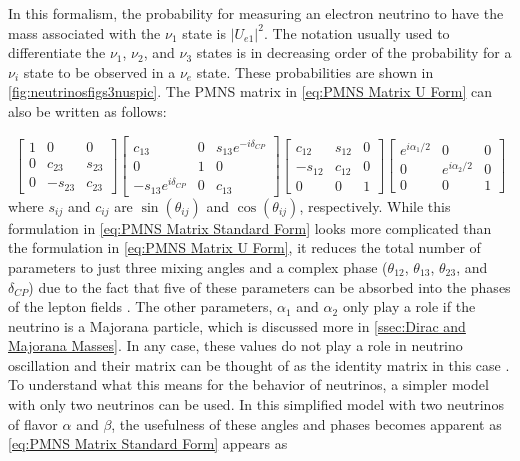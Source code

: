 In this formalism, the probability for measuring an electron neutrino to have the mass associated with the $\nu_1$ state is $|U_{e1}|^2$. The notation usually used to differentiate the $\nu_1$, $\nu_2$, and $\nu_3$ states is in decreasing order of the probability for a $\nu_i$ state to be observed in a $\nu_e$ state. These probabilities are shown in \autoref{fig:neutrinosfigs3nuspic}. The PMNS matrix in \autoref{eq:PMNS Matrix U Form} can also be written as follows: 

\begin{equation}\label{eq:PMNS Matrix Standard Form}
  \begin{bmatrix}
    1 & 0 & 0 \\
    0 & c_{23} & s_{23} \\
    0 & -s_{23} & c_{23}
  \end{bmatrix}
  \begin{bmatrix}
  c_{13} & 0 & s_{13}e^{-i\delta_{CP}} \\
  0 & 1 & 0 \\
  -s_{13}e^{i\delta_{CP}} & 0 & c_{13}
  \end{bmatrix}
  \begin{bmatrix}
  c_{12} & s_{12} & 0 \\
  -s_{12} & c_{12} & 0 \\
  0 & 0 & 1
  \end{bmatrix}
  \begin{bmatrix}
  e^{i\alpha_1/2} & 0 & 0 \\
  0 & e^{i\alpha_2/2} & 0 \\
  0 & 0 & 1
  \end{bmatrix}
\end{equation}
where $s_{ij}$ and $c_{ij}$ are $\sin(\theta_{ij})$ and $\cos(\theta_{ij})$, respectively. While this formulation in \autoref{eq:PMNS Matrix Standard Form} looks more complicated than the formulation in \autoref{eq:PMNS Matrix U Form}, it reduces the total number of parameters to just three mixing angles and a complex phase ($\theta_{12}$, $\theta_{13}$, $\theta_{23}$, and $\delta_{CP}$) due to the fact that five of these parameters can be absorbed into the phases of the lepton fields \cite{Valle:2006}. The other parameters, $\alpha_1$ and $\alpha_2$ only play a role if the neutrino is a Majorana particle, which is discussed more in \autoref{ssec:Dirac and Majorana Masses}. In any case, these values do not play a role in neutrino oscillation and their matrix can be thought of as the identity matrix in this case \cite{BILENKY1980495}. To understand what this means for the behavior of neutrinos, a simpler model with only two neutrinos can be used. In this simplified model with two neutrinos of flavor $\alpha$ and $\beta$, the usefulness of these angles and phases becomes apparent as \autoref{eq:PMNS Matrix Standard Form} appears as


